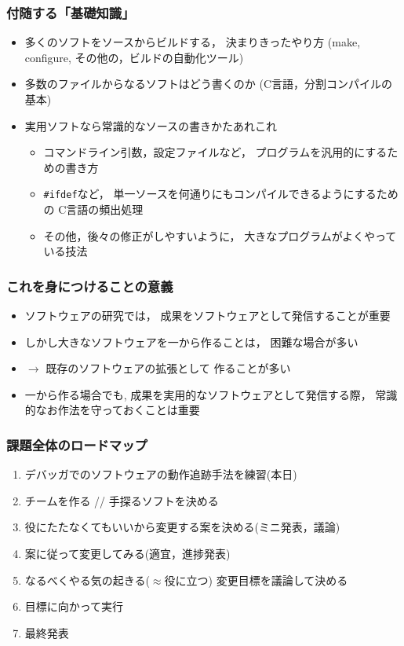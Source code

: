 \documentclass[12pt,dvipdfmx]{beamer}
\newcommand{\mura}[1]{{\color{purple}#1}}
\begin{document}
\begin{frame}
\frametitle{付随する「基礎知識」}
\begin{itemize}
\item<1-> 多くのソフトをソースからビルドする，
  決まりきったやり方
  (make, configure, その他の，\mura{ビルドの自動化}ツール)
\item<2-> 多数のファイルからなるソフトはどう書くのか
  (C言語，\mura{分割コンパイル}の基本)
\item<3-> 実用ソフトなら常識的なソースの書きかたあれこれ
  \begin{itemize}
  \item<4-> \mura{コマンドライン引数，設定ファイル}など，
    プログラムを汎用的にするための書き方
  \item<5-> \mura{\tt \#ifdef}など，
    単一ソースを何通りにもコンパイルできるようにするための
    C言語の頻出処理
  \item<6-> その他，後々の修正がしやすいように，
    大きなプログラムがよくやっている技法
  \end{itemize}
\end{itemize}
\end{frame}

\begin{frame}
\frametitle{これを身につけることの意義}
\begin{itemize}
\item ソフトウェアの研究では，
  \mura{成果をソフトウェアとして発信}することが重要

\item しかし大きなソフトウェアを一から作ることは，
  困難な場合が多い

\item $\rightarrow$ 既存のソフトウェアの拡張として
  作ることが多い

\item 一から作る場合でも,
  成果を実用的なソフトウェアとして発信する際，
  常識的なお作法を守っておくことは重要
\end{itemize}
\end{frame}

\begin{frame}
\frametitle{課題全体のロードマップ}
\begin{enumerate}
\item デバッガでのソフトウェアの動作追跡手法を練習(本日)
\item チームを作る // 手探るソフトを決める
\item 役にたたなくてもいいから変更する案を決める(ミニ発表，議論)
\item 案に従って変更してみる(適宜，進捗発表)
\item なるべくやる気の起きる($\approx$役に立つ)
  変更目標を議論して決める
\item 目標に向かって実行
\item 最終発表
\end{enumerate}
\end{frame}
\end{document}
